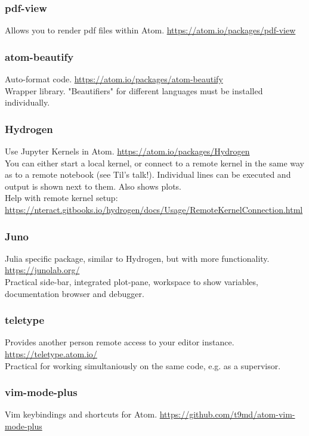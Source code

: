 \documentclass[10pt,a4paper]{article}
\begin{document}
\subsubsection{pdf-view}
Allows you to render pdf files within Atom. \url{https://atom.io/packages/pdf-view}

\subsubsection{atom-beautify}
Auto-format code. \url{https://atom.io/packages/atom-beautify}\\
Wrapper library. "Beautifiers" for different languages must be installed individually.

\subsubsection{Hydrogen}
Use Jupyter Kernels in Atom. \url{https://atom.io/packages/Hydrogen}\\
You can either start a local kernel, or connect to a remote kernel in the same way as to a remote notebook (see Til's talk!).
Individual lines can be executed and output is shown next to them. Also shows plots.\\
Help with remote kernel setup: \url{https://nteract.gitbooks.io/hydrogen/docs/Usage/RemoteKernelConnection.html}

\subsubsection{Juno}
Julia specific package, similar to Hydrogen, but with more functionality. \url{https://junolab.org/}\\
Practical side-bar, integrated plot-pane, workspace to show variables, documentation browser and debugger.

\subsubsection{teletype}
Provides another person remote access to your editor instance. \url{https://teletype.atom.io/}\\
Practical for working simultaniously on the same code, e.g. as a supervisor.

\subsubsection{vim-mode-plus}
Vim keybindings and shortcuts for Atom. \url{https://github.com/t9md/atom-vim-mode-plus}
\end{document}
